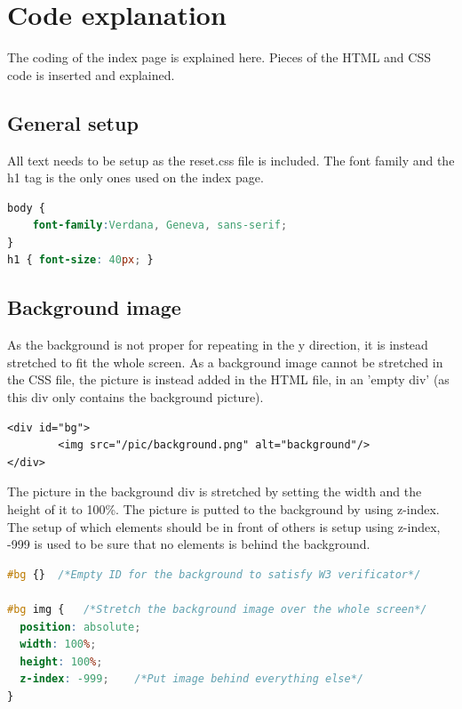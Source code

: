 \section{Code explanation}
The coding of the index page is explained here. Pieces of the HTML and CSS code is inserted and explained.
\subsection{General setup}
All text needs to be setup as the reset.css file is included. The font family and the h1 tag is the only ones used on the index page. 
\begin{lstlisting}[language=CSS]
body {
	font-family:Verdana, Geneva, sans-serif;
}
h1 { font-size: 40px; }
\end{lstlisting}

\subsection{Background image}
As the background is not proper for repeating in the y direction, it is instead stretched to fit the whole screen. As a background image cannot be stretched in the CSS file, the picture is instead added in the HTML file, in an 'empty div' (as this div only contains the background picture).
\begin{lstlisting}
<div id="bg">
		<img src="/pic/background.png" alt="background"/>
</div>
\end{lstlisting}
The picture in the background div is stretched by setting the width and the height of it to 100\%. The picture is putted to the background by using z-index. The setup of which elements should be in front of others is setup using z-index, -999 is used to be sure that no elements is behind the background.
\begin{lstlisting}[language=CSS] 
#bg {}	/*Empty ID for the background to satisfy W3 verificator*/
		
#bg img {	/*Stretch the background image over the whole screen*/
  position: absolute;
  width: 100%;
  height: 100%;
  z-index: -999;	/*Put image behind everything else*/
}
\end{lstlisting}

